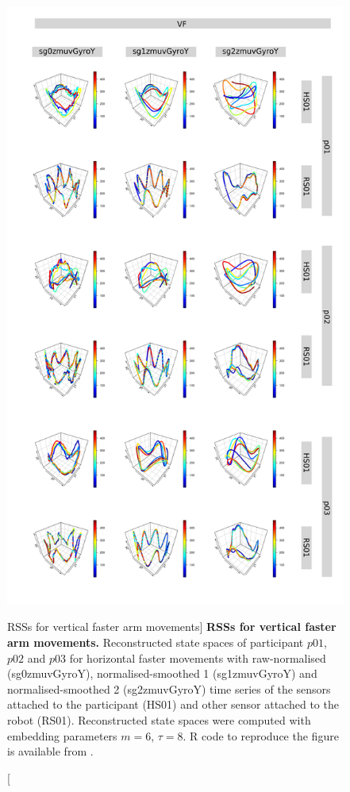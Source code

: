 \begin{figure}
\centering
\includegraphics[height=0.85\textheight]{rss_VF}
\caption
	[RSSs for vertical faster arm movements]{
	{\bf RSSs for vertical faster arm movements.}
	Reconstructed state spaces %
	of participant $p01$, $p02$ and $p03$ for horizontal faster movements 
	with raw-normalised (sg0zmuvGyroY), 
	normalised-smoothed 1 (sg1zmuvGyroY) and 
	normalised-smoothed 2 (sg2zmuvGyroY) time series of the 
	sensors attached to the participant (HS01) and other sensor 
	attached to the robot (RS01).	
	Reconstructed state spaces were computed with 
	embedding parameters $m=6$, $\tau=8$.
	R code to reproduce the figure is available from \cite{hwum2018}.
        }
    \label{fig:rss_VF}
\end{figure}







